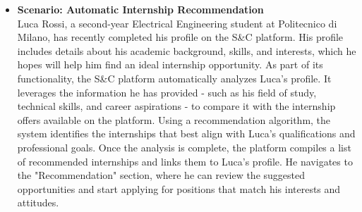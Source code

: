 \begin{itemize}
        \incscenario
    \item \textbf{\nth{\thescenario} Scenario: Automatic Internship Recommendation}
    \\
        Luca Rossi, a second-year Electrical Engineering student at Politecnico di Milano, has recently completed his profile on the S\&C platform. His profile includes details about his academic background, skills, and interests, which he hopes will help him find an ideal internship opportunity.
        As part of its functionality, the S\&C platform automatically analyzes Luca’s profile. It leverages the information he has provided - such as his field of study, technical skills, and career aspirations - to compare it with the internship offers available on the platform. Using a recommendation algorithm, the system identifies the internships that best align with Luca’s qualifications and professional goals.
        Once the analysis is complete, the platform compiles a list of recommended internships and links them to Luca's profile. He navigates to the "Recommendation" section, where he can review the suggested opportunities and start applying for positions that match his interests and attitudes.


\end{itemize}
